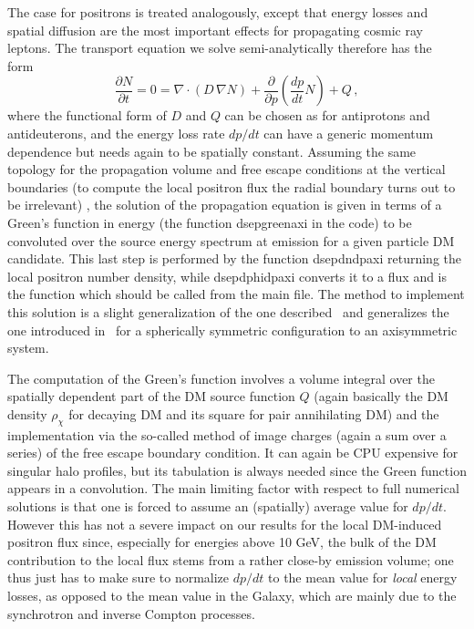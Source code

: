 \documentclass[a4paper,10pt,oneside]{book}
\newcommand{\code}[1]{\ft{#1}}
\newcommand{\ft}[1]{\textsf{#1}}
\begin{document}
The case for positrons is treated analogously, except that energy losses and spatial diffusion are
the most important effects for propagating cosmic ray leptons. The transport equation we solve 
semi-analytically therefore has the form~\cite{Baltz:1998xv}
\begin{equation}
 \frac{\partial{N}}{\partial{t}} = 0 = \nabla \cdot
 \left(D\,\nabla N\right)
 + \frac{\partial}{\partial{p}} \left( \frac{dp}{dt} N \right) + Q\,,
\label{eq:eplusdiff}
\end{equation}
where the functional form of $D$ and $Q$ can be chosen as for antiprotons and antideuterons, 
and the energy loss rate $dp/dt$ can have a generic
momentum dependence but needs again to be spatially constant. Assuming the same topology for
the propagation volume and free escape conditions at the vertical boundaries (to compute the local positron flux the radial boundary turns out to be irrelevant) ,
the solution of the propagation equation is given in terms of
a Green's function in energy (the function  \code{dsepgreenaxi} in the code) to be convoluted over the
source energy spectrum at emission for a given particle DM candidate. This last step is performed
by the function \code{dsepdndpaxi} returning the local positron number density,
while \code{dsepdphidpaxi} converts it to a flux and is the function which should be called from the main file.
The method to implement this solution is a slight generalization of the one described~\cite{Baltz:1998xv} and
generalizes the one introduced in~\cite{Colafrancesco:2005ji}
for a spherically symmetric configuration to an axisymmetric system.

The computation of the Green's function involves a volume integral over the spatially dependent part of
the DM source function $Q$ (again basically the DM density $\rho_\chi$ for decaying DM and its square for pair
 annihilating DM) 
and   the implementation via the so-called method of image charges (again a sum over a series)
of the free escape boundary condition. 
It can again be CPU expensive for singular halo profiles, but its
tabulation is always needed since the Green function appears in a convolution. The main limiting factor with
respect to full numerical solutions is that one is forced to assume an (spatially) average value for $dp/dt$. 
However this has not a severe
impact on our results for the local DM-induced positron flux since, especially for energies above 10 GeV, 
the bulk of the DM contribution to the local flux stems from a rather
close-by emission volume; one thus just has to make sure to normalize $dp/dt$ to the mean value for 
{\it local} energy losses, as opposed to the mean value in the Galaxy, which are mainly due to the 
synchrotron and inverse Compton processes.
\end{document}

